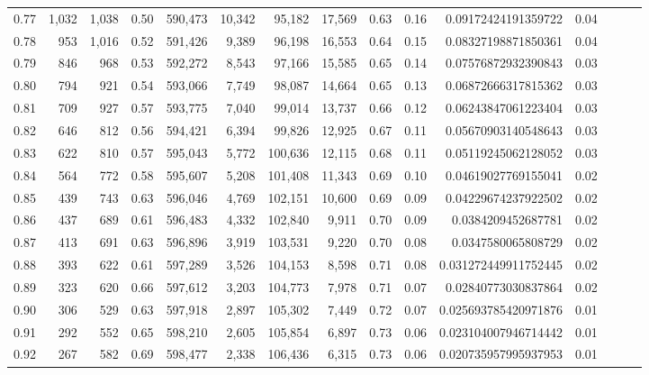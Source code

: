 \begin{tabular}{rrrrrrrrrrrrrrr}
0.77 &   1,032 &  1,038 &  0.50 &  590,473 &   10,342 &   95,182 &   17,569 &  0.63 &  0.16 &   0.09172424191359722 &      0.04 \\
0.78 &     953 &  1,016 &  0.52 &  591,426 &    9,389 &   96,198 &   16,553 &  0.64 &  0.15 &   0.08327198871850361 &      0.04 \\
0.79 &     846 &    968 &  0.53 &  592,272 &    8,543 &   97,166 &   15,585 &  0.65 &  0.14 &   0.07576872932390843 &      0.03 \\
0.80 &     794 &    921 &  0.54 &  593,066 &    7,749 &   98,087 &   14,664 &  0.65 &  0.13 &   0.06872666317815362 &      0.03 \\
0.81 &     709 &    927 &  0.57 &  593,775 &    7,040 &   99,014 &   13,737 &  0.66 &  0.12 &   0.06243847061223404 &      0.03 \\
0.82 &     646 &    812 &  0.56 &  594,421 &    6,394 &   99,826 &   12,925 &  0.67 &  0.11 &   0.05670903140548643 &      0.03 \\
0.83 &     622 &    810 &  0.57 &  595,043 &    5,772 &  100,636 &   12,115 &  0.68 &  0.11 &   0.05119245062128052 &      0.03 \\
0.84 &     564 &    772 &  0.58 &  595,607 &    5,208 &  101,408 &   11,343 &  0.69 &  0.10 &   0.04619027769155041 &      0.02 \\
0.85 &     439 &    743 &  0.63 &  596,046 &    4,769 &  102,151 &   10,600 &  0.69 &  0.09 &   0.04229674237922502 &      0.02 \\
0.86 &     437 &    689 &  0.61 &  596,483 &    4,332 &  102,840 &    9,911 &  0.70 &  0.09 &    0.0384209452687781 &      0.02 \\
0.87 &     413 &    691 &  0.63 &  596,896 &    3,919 &  103,531 &    9,220 &  0.70 &  0.08 &    0.0347580065808729 &      0.02 \\
0.88 &     393 &    622 &  0.61 &  597,289 &    3,526 &  104,153 &    8,598 &  0.71 &  0.08 &  0.031272449911752445 &      0.02 \\
0.89 &     323 &    620 &  0.66 &  597,612 &    3,203 &  104,773 &    7,978 &  0.71 &  0.07 &   0.02840773030837864 &      0.02 \\
0.90 &     306 &    529 &  0.63 &  597,918 &    2,897 &  105,302 &    7,449 &  0.72 &  0.07 &  0.025693785420971876 &      0.01 \\
0.91 &     292 &    552 &  0.65 &  598,210 &    2,605 &  105,854 &    6,897 &  0.73 &  0.06 &  0.023104007946714442 &      0.01 \\
0.92 &     267 &    582 &  0.69 &  598,477 &    2,338 &  106,436 &    6,315 &  0.73 &  0.06 &  0.020735957995937953 &      0.01 \\

\end{tabular}
